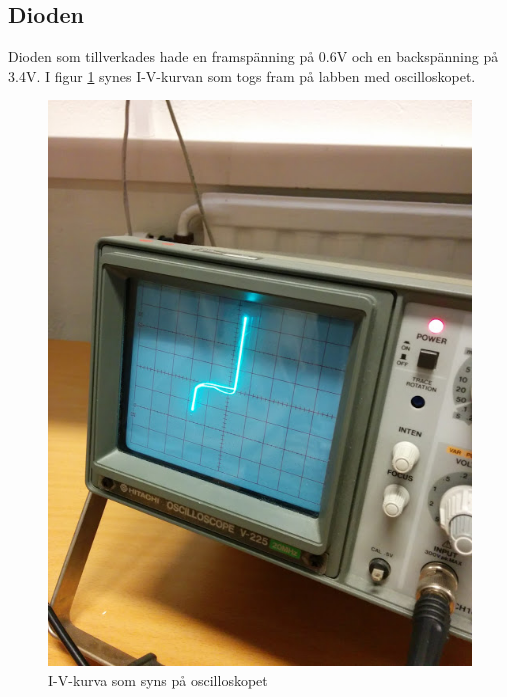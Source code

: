 \documentclass[a4paper]{article}
\begin{document}
\subsection{Dioden}
Dioden som tillverkades hade en framspänning på 0.6V och en backspänning på 3.4V. I figur \ref{diodiv} synes I-V-kurvan som togs fram på labben med oscilloskopet.
\begin{figure}[H]
	\centering
	\includegraphics[scale=.4]{diod.jpg}
	\caption{I-V-kurva som syns på oscilloskopet}
	\label{diodiv}
\end{figure}
\end{document}
